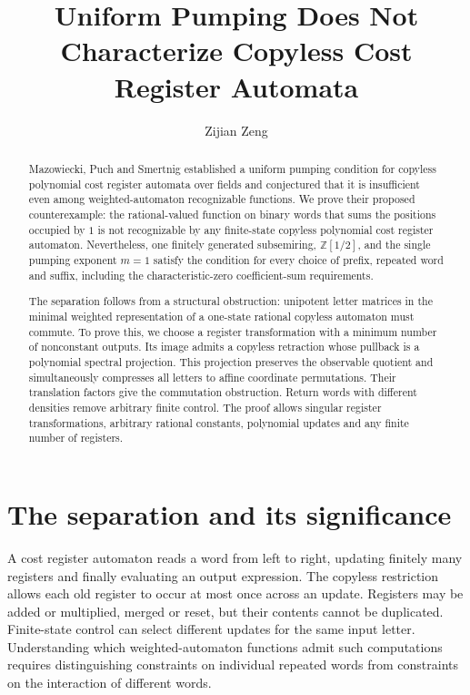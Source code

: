 \documentclass[acmlarge,screen,11pt,nonacm]{acmart}
\title{Uniform Pumping Does Not Characterize Copyless Cost Register Automata}
\author{Zijian Zeng}
\affiliation{\institution{UCSI University}\country{Malaysia}}
\newcommand{\Z}{\mathbb{Z}}
\theoremstyle{definition}
\begin{document}
\begin{abstract}
\normalsize
Mazowiecki, Puch and Smertnig established a uniform pumping condition for copyless polynomial cost register automata over fields and conjectured that it is insufficient even among weighted-automaton recognizable functions. We prove their proposed counterexample: the rational-valued function on binary words that sums the positions occupied by $1$ is not recognizable by any finite-state copyless polynomial cost register automaton. Nevertheless, one finitely generated subsemiring, $\Z[1/2]$, and the single pumping exponent $m=1$ satisfy the condition for every choice of prefix, repeated word and suffix, including the characteristic-zero coefficient-sum requirements.

The separation follows from a structural obstruction: unipotent letter matrices in the minimal weighted representation of a one-state rational copyless automaton must commute. To prove this, we choose a register transformation with a minimum number of nonconstant outputs. Its image admits a copyless retraction whose pullback is a polynomial spectral projection. This projection preserves the observable quotient and simultaneously compresses all letters to affine coordinate permutations. Their translation factors give the commutation obstruction. Return words with different densities remove arbitrary finite control. The proof allows singular register transformations, arbitrary rational constants, polynomial updates and any finite number of registers.
\end{abstract}
\maketitle
\thispagestyle{plain}
\clearpage

\section{The separation and its significance}
A cost register automaton reads a word from left to right, updating finitely many registers and finally evaluating an output expression. The copyless restriction allows each old register to occur at most once across an update. Registers may be added or multiplied, merged or reset, but their contents cannot be duplicated. Finite-state control can select different updates for the same input letter. Understanding which weighted-automaton functions admit such computations requires distinguishing constraints on individual repeated words from constraints on the interaction of different words.
\end{document}
